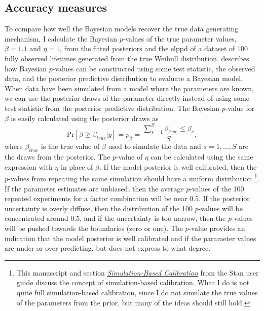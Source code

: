 \subsection{Accuracy measures} \label{subsec:accuracy-measures}

To compare how well the Bayesian models recover the true data generating mechanism, I calculate the Bayesian $p$-values of the true parameter values, $\beta = 1.1$ and $\eta = 1$, from the fitted posteriors and the elppd of a dataset of 100 fully observed lifetimes generated from the true Weibull distribution. \citet[p.~146]{BDA2020} describes how Bayesian $p$-values can be constructed using some test statistic, the observed data, and the posterior predictive distribution to evaluate a Bayesian model. When data have been simulated from a model where the parameters are known, we can use the posterior draws of the parameter directly instead of using some test statistic from the posterior predictive distribution. The Bayesian $p$-value for $\beta$ is easily calculated using the posterior draws as
\begin{equation*}
    \text{Pr}\left[\beta \ge \beta_{true}|y\right] = p_{\beta} = \frac{\sum^{S}_{s = 1}{\beta_{true} \le \beta_s}}{S},
\end{equation*}
where $\beta_{true}$ is the true value of $\beta$ used to simulate the data and $s = {1,\dots, S}$ are the draws from the posterior. The $p$-value of $\eta$ can be calculated using the same expression with $\eta$ in place of $\beta$. If the model posterior is well calibrated, then the $p$-values from repeating the same simulation should have a uniform distribution \citep{talts2020, stan_user_guide2024}\footnote{This manuscript and section \href{https://mc-stan.org/docs/stan-users-guide/simulation-based-calibration.html}{\textit{Simulation-Based Calibration}} from the Stan user guide discuss the concept of simulation-based calibration. What I do is not quite full simulation-based calibration, since I do not simulate the true values of the parameters from the prior, but many of the ideas should still hold.}. If the parameter estimates are unbiased, then the average $p$-values of the 100 repeated experiments for a factor combination will be near $0.5$. If the posterior uncertainty is overly diffuse, then the distribution of the 100 $p$-values will be concentrated around $0.5$, and if the uncertainty is too narrow, then the $p$-values will be pushed towards the boundaries (zero or one). The $p$-value provides an indication that the model posterior is well calibrated and if the parameter values are under or over-predicting, but does not express to what degree.

